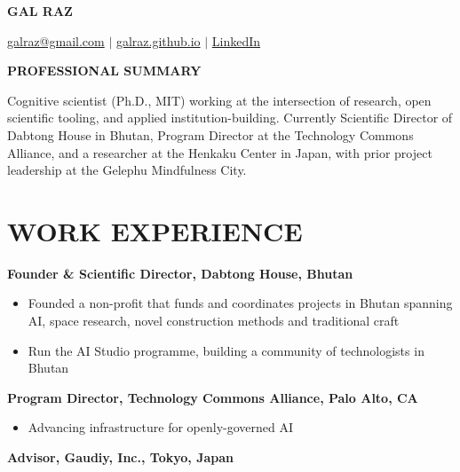 \documentclass[11pt]{article}
\begin{document}
\begin{center}
{\huge\bfseries{GAL  RAZ}}

\vspace{0.3cm}

\href{mailto:galraz@gmail.com}{galraz@gmail.com} \quad $\mid$ \quad \href{https://galraz.github.io}{galraz.github.io} \quad $\mid$ \quad \href{https://www.linkedin.com/in/gal-raz-0796aab4/}{LinkedIn}
\end{center}

\vspace*{-0.3cm}

\begin{center}
{\large\bfseries PROFESSIONAL SUMMARY}
\end{center}
\vspace{-0.2cm}

Cognitive scientist (Ph.D., MIT) working at the intersection of research, open scientific tooling, and applied institution-building. Currently Scientific Director of Dabtong House in Bhutan, Program Director at the Technology Commons Alliance, and a researcher at the Henkaku Center in Japan, with prior project leadership at the Gelephu Mindfulness City.

\section*{WORK EXPERIENCE}

 \textbf{Founder \& Scientific Director, Dabtong House, Bhutan}
  \vspace{-0.2cm}
\begin{itemize}[itemsep=1pt]
    \item Founded a non-profit that funds and coordinates projects in Bhutan spanning AI, space research, novel construction methods and traditional craft
    \item Run the AI Studio programme, building a community of technologists in Bhutan
\end{itemize}

 \textbf{Program Director, Technology Commons Alliance, Palo Alto, CA}
  \vspace{-0.2cm}
\begin{itemize}[itemsep=1pt]
    \item Advancing infrastructure for openly-governed AI
\end{itemize}

 \textbf{Advisor, Gaudiy, Inc., Tokyo, Japan}
\end{document}
